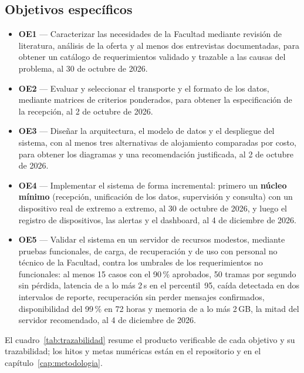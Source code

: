 \subsection{Objetivos específicos}
\begin{itemize}
\item \textbf{OE1} — Caracterizar las necesidades de la Facultad mediante revisión de literatura,
análisis de la oferta y al menos dos entrevistas documentadas, para obtener un catálogo de
requerimientos validado y trazable a las causas del problema, al 30 de octubre de 2026.
\item \textbf{OE2} — Evaluar y seleccionar el transporte y el formato de los datos, mediante
matrices de criterios ponderados, para obtener la especificación de la recepción, al 2 de octubre
de 2026.
\item \textbf{OE3} — Diseñar la arquitectura, el modelo de datos y el despliegue del sistema, con
al menos tres alternativas de alojamiento comparadas por costo, para obtener los diagramas y una
recomendación justificada, al 2 de octubre de 2026.
\item \textbf{OE4} — Implementar el sistema de forma incremental: primero un \textbf{núcleo
mínimo} (recepción, unificación de los datos, supervisión y consulta) con un dispositivo real de
extremo a extremo, al 30 de octubre de 2026, y luego el registro de dispositivos, las alertas y el
dashboard, al 4 de diciembre de 2026.
\item \textbf{OE5} — Validar el sistema en un servidor de recursos modestos, mediante pruebas
funcionales, de carga, de recuperación y de uso con personal no técnico de la Facultad, contra los
umbrales de los requerimientos no funcionales: al menos 15 casos con el 90\,\% aprobados, 50 tramas
por segundo sin pérdida, latencia de a lo más 2\,s en el percentil~95, caída detectada en dos
intervalos de reporte, recuperación sin perder mensajes confirmados, disponibilidad del 99\,\% en
72 horas y memoria de a lo más 2\,GB, la mitad del servidor recomendado, al 4 de diciembre de 2026.
\end{itemize}

El cuadro~\ref{tab:trazabilidad} resume el producto verificable de cada objetivo y su trazabilidad;
los hitos y metas numéricas están en el repositorio y en el capítulo~\ref{cap:metodologia}.


